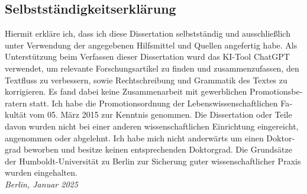 \cleardoublepage

\begin{otherlanguage}{ngerman}

\chapter{Selbstständigkeitserklärung}

Hiermit erkläre ich, dass ich diese Dissertation selbstständig und
ausschließlich unter Verwendung der angegebenen Hilfsmittel und
Quellen angefertig habe. 
Als Unterstützung beim Verfassen dieser Dissertation wurd das KI-Tool ChatGPT verwendet, um relevante Forschungsartikel zu finden und zusammenzufassen, den Textfluss zu verbessern, sowie Rechtschreibung und Grammatik des Textes zu korrigieren.
Es fand dabei keine Zusammenarbeit mit gewerblichen
Promotionsberatern statt. Ich habe die Promotionsordnung
der Lebenswissenschaftlichen Fakultät vom 05. März 2015 zur Kenntnis
genommen. Die Dissertation oder Teile davon wurden nicht bei einer anderen wissenschaftlichen Einrichtung eingereicht, angenommen
oder abgelehnt. Ich habe mich nicht anderwärts um einen
Doktorgrad beworben und besitze keinen entsprechenden Doktorgrad.
Die Grundsätze der Humboldt-Universität zu Berlin zur Sicherung
guter wissenschaftlicher Praxis wurden eingehalten.\\

\textit{Berlin, Januar 2025}


\end{otherlanguage}
